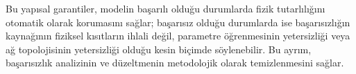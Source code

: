 Bu yapısal garantiler, modelin başarılı olduğu durumlarda fizik tutarlılığını otomatik olarak korumasını sağlar; başarısız olduğu durumlarda ise başarısızlığın kaynağının fiziksel kısıtların ihlali değil, parametre öğrenmesinin yetersizliği veya ağ topolojisinin yetersizliği olduğu kesin biçimde söylenebilir. Bu ayrım, başarısızlık analizinin ve düzeltmenin metodolojik olarak temizlenmesini sağlar.
